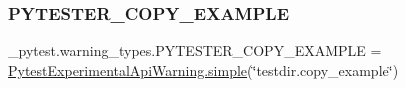 \subsubsection{\texorpdfstring{P\+Y\+T\+E\+S\+T\+E\+R\+\_\+\+C\+O\+P\+Y\+\_\+\+E\+X\+A\+M\+P\+LE}{PYTESTER\_COPY\_EXAMPLE}}
{\footnotesize\ttfamily \+\_\+pytest.\+warning\+\_\+types.\+P\+Y\+T\+E\+S\+T\+E\+R\+\_\+\+C\+O\+P\+Y\+\_\+\+E\+X\+A\+M\+P\+LE = \hyperlink{class__pytest_1_1warning__types_1_1_pytest_experimental_api_warning_a513876a6d9cef7cb5af82899777db432}{Pytest\+Experimental\+Api\+Warning.\+simple}(\char`\"{}testdir.\+copy\+\_\+example\char`\"{})}

